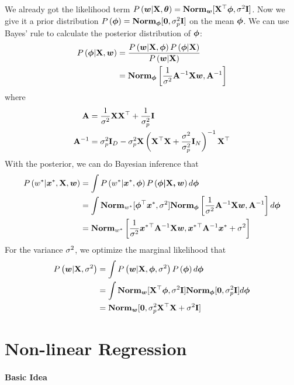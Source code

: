 We already got the likelihood term $P\left(\boldsymbol{w}|\mathbf{X},\boldsymbol{\theta}\right)=\mathbf{Norm}_{\boldsymbol{w}}[\mathbf{X}{}^\top\boldsymbol{\phi},\sigma^2\mathbf{I}]$. Now we give it a prior distribution $P\left(\boldsymbol{\phi}\right)=\mathbf{Norm}_{\boldsymbol{\phi}}[\boldsymbol{0},\sigma_p^2\mathbf{I}]$ on the mean $\boldsymbol{\phi}$. We can use Bayes' rule to calculate the posterior distribution of $\boldsymbol{\phi}$:
\begin{align*}
	P\left(\boldsymbol{\phi}|\mathbf{X},\boldsymbol{w}\right)&=\frac{P\left(\boldsymbol{w}|\mathbf{X},\boldsymbol{\phi}\right)P\left(\boldsymbol{\phi}|\mathbf{X}\right)}{P\left(\boldsymbol{w}|\mathbf{X}\right)} \\
	&=\mathbf{Norm}_{\boldsymbol{\phi}}\left[\frac{1}{\sigma^2}\mathbf{A}^{-1}\mathbf{X}\boldsymbol{w},\mathbf{A}^{-1}\right]
\end{align*}
where
\begin{align*}
	\mathbf{A}&=\frac{1}{\sigma^2}\mathbf{X}\mathbf{X}{}^\top+\frac{1}{\sigma_p^2}\mathbf{I} \\
	\mathbf{A}^{-1}&=\sigma_p^2\mathbf{I}_D-\sigma_p^2\mathbf{X}\left(\mathbf{X}{}^\top\mathbf{X}+\frac{\sigma^2}{\sigma_p^2}\mathbf{I}_N\right)^{-1}\mathbf{X}{}^\top
\end{align*}
With the posterior, we can do Bayesian inference that
\begin{align*}
	P\left(w^*|\boldsymbol{x}^*,\mathbf{X},\boldsymbol{w}\right)&=\int P\left(w^*|\boldsymbol{x}^*,\boldsymbol{\phi}\right)P\left(\boldsymbol{\phi|\mathbf{X},\boldsymbol{w}}\right)d\boldsymbol{\phi} \\
	&=\int\mathbf{Norm}_{w^*}[\boldsymbol{\phi}{}^\top\boldsymbol{x}^*,\sigma^2]\mathbf{Norm}_{\boldsymbol{\phi}}\left[\frac{1}{\sigma^2}\mathbf{A}^{-1}\mathbf{X}\boldsymbol{w},\mathbf{A}^{-1}\right]d\boldsymbol{\phi} \\
	&=\mathbf{Norm}_{w^*}\left[\frac{1}{\sigma^2}\boldsymbol{x}^*{}^\top\mathbf{A}^{-1}\mathbf{X}\boldsymbol{w},\boldsymbol{x}^*{}^\top\mathbf{A}^{-1}\boldsymbol{x}^*+\sigma^2\right]
\end{align*}
For the variance $\sigma^2$, we optimize the marginal likelihood that
\begin{align*}
	P\left(\boldsymbol{w}|\mathbf{X},\sigma^2\right)&=\int P\left(\boldsymbol{w}|\mathbf{X},\boldsymbol{\phi},\sigma^2\right)P\left(\boldsymbol{\phi}\right)d\boldsymbol{\phi} \\
	&=\int\mathbf{Norm}_{\boldsymbol{w}}[\mathbf{X}{}^\top\boldsymbol{\phi},\sigma^2\mathbf{I}]\mathbf{Norm}_{\boldsymbol{\phi}}[\boldsymbol{0},\sigma_p^2\mathbf{I}]d\boldsymbol{\phi} \\
	&=\mathbf{Norm}_{\boldsymbol{w}}[\boldsymbol{0},\sigma_p^2\mathbf{X}{}^\top\mathbf{X}+\sigma^2\mathbf{I}]
\end{align*}

\section{Non-linear Regression}

\paragraph{Basic Idea}

